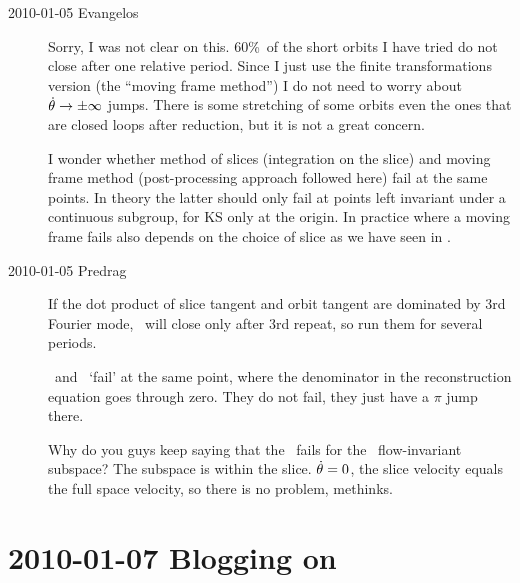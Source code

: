 \begin{description}
\item[2010-01-05 Evangelos] Sorry, I was not clear on this. 60\%\ of the short orbits
I have tried do not close after one relative period. Since I just use the finite
transformations version (the ``moving frame method'') I do not need to worry about
$ \dot{\theta} \to \pm\infty$ jumps. There is some stretching of some orbits even the
ones that are closed loops after reduction, but it is not a great concern.

I wonder whether method of slices (integration on the slice) and moving
frame method (post-processing approach followed here) fail at the same
points. In theory the latter should only fail at points left invariant
under a continuous subgroup, for KS only at the origin. In practice where
a moving frame fails also depends on the choice of slice as we have seen
in \cLe.

\item[2010-01-05 Predrag] If the dot product of slice tangent
and orbit tangent are dominated by 3rd Fourier mode, \rpo\
will close only after 3rd repeat, so run them for several
periods.

\Mslices\ and \mframes\ `fail' at the same point, where the
denominator in the reconstruction equation goes through zero.
They do not fail, they just have a $\pi$ jump there.

Why do you guys keep saying that the \mslices\ fails for the
\Fix{\Group}\ flow-invariant subspace? The subspace is within
the slice. $\dot{\theta}=0$, the slice velocity equals the
full space velocity, so there is no problem, methinks.

\end{description}

\section{2010-01-07 Blogging on}

